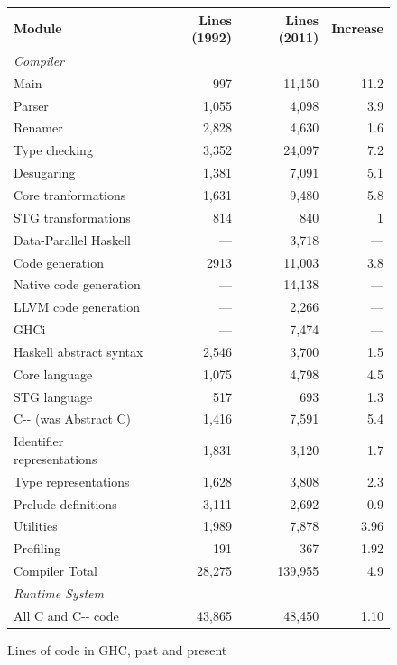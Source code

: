 \documentclass{article}
\begin{document}
\begin{figure}
\begin{tabular}{|lrrr|}
\hline
Module & Lines (1992) & Lines (2011) & Increase \\

\hline
\multicolumn{4}{|l|}{\emph{Compiler}} \\
Main    & 997 & 11,150 & 11.2 \\
Parser  & 1,055 & 4,098 & 3.9 \\
Renamer & 2,828 & 4,630 & 1.6 \\
Type checking & 3,352 & 24,097 & 7.2 \\
Desugaring & 1,381 & 7,091 & 5.1 \\
Core tranformations & 1,631 & 9,480 & 5.8 \\
STG transformations & 814 & 840 & 1 \\
Data-Parallel Haskell & --- & 3,718 & --- \\
Code generation & 2913 & 11,003 & 3.8 \\
Native code generation & --- & 14,138 & --- \\
LLVM code generation & --- & 2,266 & --- \\
GHCi & --- & 7,474 & --- \\
Haskell abstract syntax & 2,546 & 3,700 & 1.5 \\
Core language & 1,075 & 4,798 & 4.5 \\
STG language & 517 & 693 & 1.3 \\
C{-}{-} (was Abstract C)  & 1,416 & 7,591 & 5.4 \\
Identifier representations & 1,831 & 3,120 & 1.7 \\
Type representations & 1,628 & 3,808 & 2.3 \\
Prelude definitions & 3,111 & 2,692 & 0.9 \\
Utilities & 1,989 & 7,878 & 3.96 \\
Profiling & 191 & 367 & 1.92 \\

\hline
Compiler Total  & 28,275 & 139,955 & 4.9 \\ \hline

\hline
\multicolumn{4}{|l|}{\emph{Runtime System}} \\
All C and C{-}{-} code & 43,865 & 48,450 & 1.10 \\
\hline
\end{tabular}
\caption{Lines of code in GHC, past and present} \label{f:lines}
\end{figure}
\end{document}
